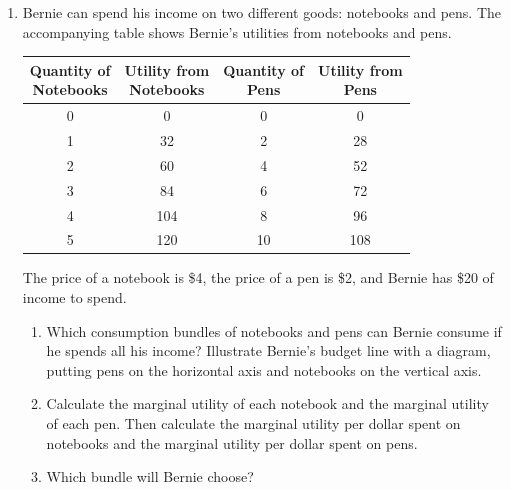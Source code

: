 \documentclass{article}
\begin{document}
\begin{enumerate}
\begin{enumerate}
	\end{enumerate}
	
\item Bernie can spend his income on two different goods: notebooks and pens. The accompanying table shows Bernie's utilities from notebooks and pens.

	\begin{center}
	\begin{tabular}{c c | c c}
	\makecell{Quantity of\\Notebooks} & \makecell{Utility from\\Notebooks} & \makecell{Quantity of\\Pens} & \makecell{Utility from\\Pens} \\
	\hline
	0 & 0 & 0 & 0 \\
	1 & 32 & 2 & 28 \\
	2 & 60 & 4 & 52 \\
	3 & 84 & 6 & 72 \\
	4 & 104 & 8 & 96 \\
	5 & 120 & 10 & 108
	\end{tabular}
	\end{center}
	
	The price of a notebook is \$4, the price of a pen is \$2, and Bernie has \$20 of income to spend.
	
	\begin{enumerate}
	
	\item Which consumption bundles of notebooks and pens can Bernie consume if he spends all his income? Illustrate Bernie's budget line with a diagram, putting pens on the horizontal axis and notebooks on the vertical axis.
	
	\item Calculate the marginal utility of each notebook and the marginal utility of each pen. Then calculate the marginal utility per dollar spent on notebooks and the marginal utility per dollar spent on pens.
	
	\item Which bundle will Bernie choose?
	
	\end{enumerate}

\end{enumerate}
\end{document}

